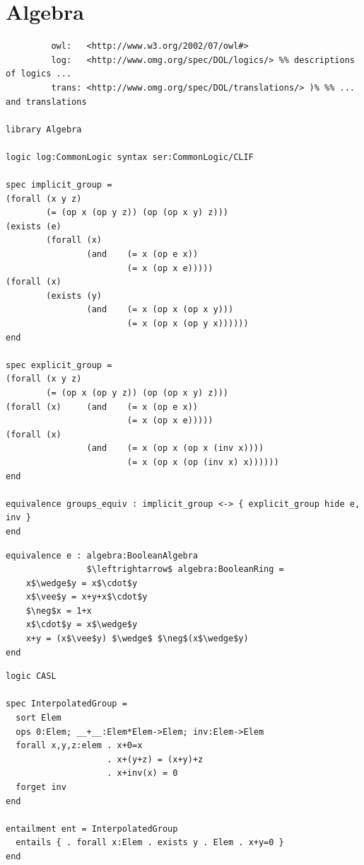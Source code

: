 \documentclass[10pt,fleqn,%
\ifpretendfinal
final%
\else
draft%
\fi,
]{scrreprt}
\newcommand{\sclause}[1]{\section{#1}}
\begin{document}
\sclause{Algebra}


\begin{lstlisting}[basicstyle=\ttfamily,language=dolText,morekeywords={props,ObjectProperty,Class,DisjointUnionOf,SubClassOf,Characteristics,Transitive,Asymmetric,SubPropertyOf,DisjointClasses,EquivalentTo,inverse,only,forall,iff,if,or,exists,distributed,equivalence},escapechar=@,mathescape]
%prefix( :     <http://www.example.org/alignment#>
         owl:   <http://www.w3.org/2002/07/owl#>
         log:   <http://www.omg.org/spec/DOL/logics/> %% descriptions of logics ...
         trans: <http://www.omg.org/spec/DOL/translations/> )% %% ... and translations

library Algebra

logic log:CommonLogic syntax ser:CommonLogic/CLIF

spec implicit_group =
(forall (x y z)
        (= (op x (op y z)) (op (op x y) z)))
(exists (e)
        (forall (x)
                (and    (= x (op e x))
                        (= x (op x e)))))
(forall (x)
        (exists (y)
                (and    (= x (op x (op x y)))
                        (= x (op x (op y x))))))
end

spec explicit_group =
(forall (x y z)
        (= (op x (op y z)) (op (op x y) z)))
(forall (x)     (and    (= x (op e x))
                        (= x (op x e)))))
(forall (x)
                (and    (= x (op x (op x (inv x))))
                        (= x (op x (op (inv x) x))))))
end

equivalence groups_equiv : implicit_group <-> { explicit_group hide e, inv }
end
\end{lstlisting}

\begin{lstlisting}[basicstyle=\ttfamily,language=dolText,morekeywords={props,ObjectProperty,Class,DisjointUnionOf,SubClassOf,Characteristics,Transitive,Asymmetric,SubPropertyOf,DisjointClasses,EquivalentTo,inverse,only,forall,iff,if,or,exists,sort,ops,in,approximate,extract,equivalence,spec},escapechar=@,mathescape]
equivalence e : algebra:BooleanAlgebra
                $\leftrightarrow$ algebra:BooleanRing =
    x$\wedge$y = x$\cdot$y
    x$\vee$y = x+y+x$\cdot$y
    $\neg$x = 1+x
    x$\cdot$y = x$\wedge$y
    x+y = (x$\vee$y) $\wedge$ $\neg$(x$\wedge$y)
end
\end{lstlisting}

\begin{lstlisting}[basicstyle=\ttfamily,language=dolText,morekeywords={props,ObjectProperty,Class,DisjointUnionOf,SubClassOf,Characteristics,Transitive,Asymmetric,SubPropertyOf,DisjointClasses,EquivalentTo,inverse,only,forall,iff,if,or,exists,sort,ops,forget,entails,entailment,spec},escapechar=@,mathescape]
logic CASL

spec InterpolatedGroup =
  sort Elem
  ops 0:Elem; __+__:Elem*Elem->Elem; inv:Elem->Elem
  forall x,y,z:elem . x+0=x
                    . x+(y+z) = (x+y)+z
                    . x+inv(x) = 0
  forget inv
end

entailment ent = InterpolatedGroup 
  entails { . forall x:Elem . exists y . Elem . x+y=0 }
end
\end{lstlisting}
\end{document}
